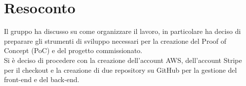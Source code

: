 \section{Resoconto}

Il gruppo ha discusso su come organizzare il lavoro, in particolare ha deciso di preparare gli strumenti di sviluppo necessari per la creazione del Proof of Concept (PoC) e del progetto commissionato.\\
Si è deciso di procedere con la creazione dell'account AWS, dell'account Stripe per il checkout e la creazione di due repository su GitHub per la gestione del front-end e del back-end.
